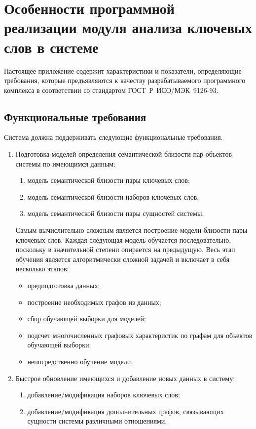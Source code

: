 \chapter{Особенности программной реализации модуля анализа ключевых слов в системе}
Настоящее приложение содержит характеристики и показатели, определяющие требования, которые предъявляются к качеству разрабатываемого программного комплекса в соответствии со стандартом \mbox{ГОСТ Р ИСО/МЭК 9126-93}.
\section{Функциональные требования}
Система должна поддерживать следующие функциональные требования.
\begin{enumerate}
    \item  Подготовка моделей определения семантической близости пар объектов системы по имеющимся данным:
    \begin{enumerate}
        \item  модель семантической близости пары ключевых слов;
        \item  модель семантической близости наборов ключевых слов;
        \item  модель семантической близости пары сущностей системы.
    \end{enumerate}
    Самым вычислительно сложным является построение модели близости пары ключевых слов. Каждая следующая модель обучается последовательно, поскольку в значительной степени опирается на предыдущую. Весь этап обучения является алгоритмически сложной задачей и включает в себя несколько этапов:
        \begin{itemize}
            \item предподготовка данных;
            \item построение необходимых графов из данных;
            \item сбор обучающей выборки для моделей;
            \item подсчет многочисленных графовых характеристик по графам для объектов обучающей выборки;
            \item непосредственно обучение модели.
        \end{itemize}
    \item Быстрое обновление имеющихся и добавление новых данных в систему:
    \begin{enumerate}
        \item добавление/модификация наборов ключевых слов;
        \item добавление/модификация дополнительных графов, связывающих сущности системы различными отношениями.

\end{enumerate}
\end{enumerate}
